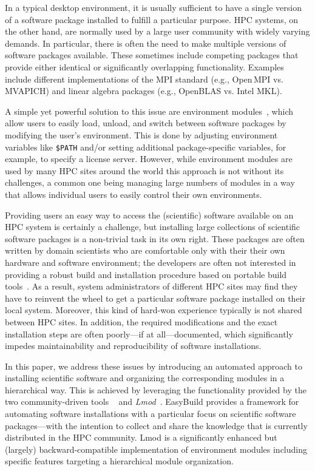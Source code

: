 In a typical desktop environment, it is usually sufficient to have a
single version of a software package installed to fulfill a particular purpose. HPC
systems, on the other hand, are normally used by a large user community with widely varying
demands. In particular, there is often the need to make multiple versions of
software packages available. These sometimes include competing packages
that provide either identical or significantly overlapping functionality. Examples include
 different implementations of the MPI standard (e.g., Open\,MPI vs.
MVAPICH) and linear algebra packages (e.g., OpenBLAS vs. Intel MKL).

A simple yet powerful solution to this issue are environment
modules~\cite{furlani91,furlani96,eadline,laytonEM1}, which allow
users to easily load, unload, and switch between software packages by
modifying the user's environment. This is done by adjusting environment
variables like \texttt{\small\$PATH} and/or setting additional package-specific
variables, for example, to specify a license server.
However, while environment modules are used by many
HPC sites around the world this approach is not without its challenges,
a common one being managing large numbers of modules in a way that allows individual
users to easily control their own environments.

Providing users an easy way to access the (scientific) software
available on an HPC system is certainly a challenge, but installing large collections
of scientific software packages is a
non-trivial task in its own right. These packages are often written by domain
scientists who are comfortable only with their their own hardware and software
environment; the developers are often not interested in providing a robust
build and installation procedure based on portable build
tools~\cite{Dubois03}. As a result, system administrators of different HPC sites may
find they have to reinvent the wheel to
get a particular software package installed on their local system. Moreover, this
kind of hard-won experience typically is not shared between HPC sites. In
addition, the required modifications and the exact installation steps are
often poorly---if at all---documented, which significantly impedes
maintainability and reproducibility of software installations.

In this paper, we address these issues by introducing an automated approach to
installing scientific software and organizing the corresponding modules in a
hierarchical way. This is achieved by leveraging the functionality provided by the
two community-driven tools \emph{\easybuild{}}~\cite{EasyBuildSC12} and
\emph{Lmod}~\cite{taccLmod}. EasyBuild provides a
framework for automating software installations with a particular focus on
scientific software packages---with the intention to collect and share the
knowledge that is currently distributed in the HPC community.
Lmod is a significantly enhanced but
(largely) backward-compatible implementation of environment modules including specific
features targeting a hierarchical module organization.

